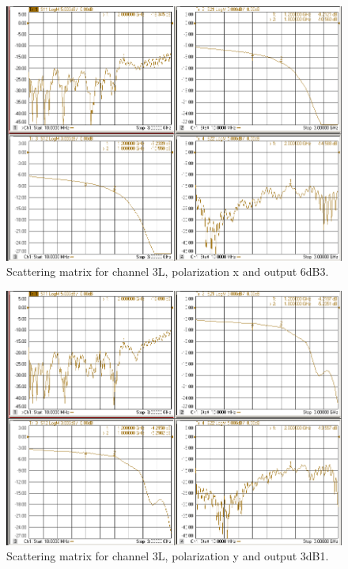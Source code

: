 \documentclass[12pt,a4paper,oneside]{article}
\begin{document}
\begin{figure}[H]
\centering
\includegraphics[width=0.9\linewidth]{VNA_results/3Lx_6dB3.png}
\caption{Scattering matrix for channel 3L, polarization x and output 6dB3.}
\label{fig:3Lx_6dB3}
\end{figure}


\begin{figure}[H]
\centering
\includegraphics[width=0.9\linewidth]{VNA_results/3Ly_3dB1.png}
\caption{Scattering matrix for channel 3L, polarization y and output 3dB1.}
\label{fig:3Ly_3dB1}
\end{figure}
\end{document}
